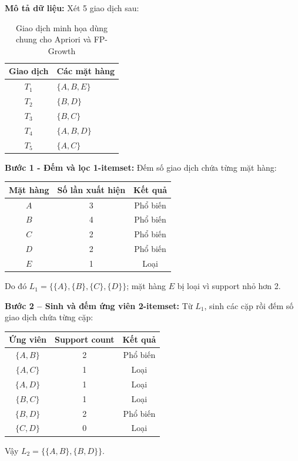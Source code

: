 \textbf{Mô tả dữ liệu:} Xét 5 giao dịch sau:
\begin{table}[H]
    \centering
    \begin{tabular}{|c|l|}
        \hline
        \textbf{Giao dịch} & \textbf{Các mặt hàng} \\
        \hline
        $T_1$ & $\{A,B,E\}$ \\ \hline
        $T_2$ & $\{B,D\}$ \\ \hline
        $T_3$ & $\{B,C\}$ \\ \hline
        $T_4$ & $\{A,B,D\}$ \\ \hline
        $T_5$ & $\{A,C\}$ \\ \hline
    \end{tabular}
    \caption{Giao dịch minh họa dùng chung cho Apriori và FP-Growth}
    \label{tab:association-example}
\end{table}

\textbf{Bước 1 - Đếm và lọc 1-itemset:} Đếm số giao dịch chứa từng mặt hàng:
\begin{center}
\begin{tabular}{|c|c|c|}
    \hline
    \textbf{Mặt hàng} & \textbf{Số lần xuất hiện} & \textbf{Kết quả} \\
    \hline
    $A$ & 3 & Phổ biến \\ \hline
    $B$ & 4 & Phổ biến \\ \hline
    $C$ & 2 & Phổ biến \\ \hline
    $D$ & 2 & Phổ biến \\ \hline
    $E$ & 1 & Loại \\
    \hline
\end{tabular}
\end{center}
Do đó $L_1=\{\{A\},\{B\},\{C\},\{D\}\}$; mặt hàng $E$ bị loại vì support nhỏ hơn 2.

\textbf{Bước 2 -- Sinh và đếm ứng viên 2-itemset:} Từ $L_1$, sinh các cặp rồi đếm số giao dịch chứa từng cặp:
\begin{center}
\begin{tabular}{|c|c|c|}
    \hline
    \textbf{Ứng viên} & \textbf{Support count} & \textbf{Kết quả} \\
    \hline
    $\{A,B\}$ & 2 & Phổ biến \\ \hline
    $\{A,C\}$ & 1 & Loại \\ \hline
    $\{A,D\}$ & 1 & Loại \\ \hline
    $\{B,C\}$ & 1 & Loại \\ \hline
    $\{B,D\}$ & 2 & Phổ biến \\ \hline
    $\{C,D\}$ & 0 & Loại \\
    \hline
\end{tabular}
\end{center}
Vậy $L_2=\{\{A,B\},\{B,D\}\}$.

